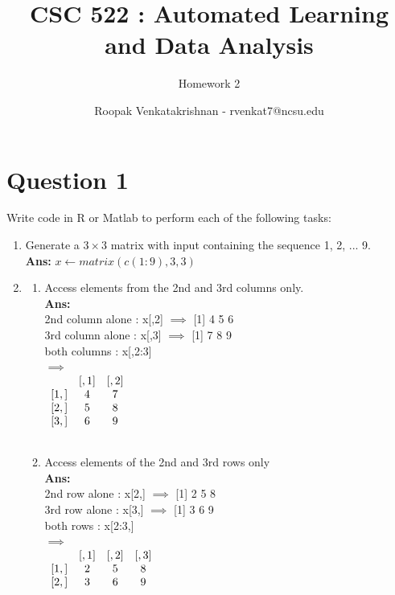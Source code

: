 \documentclass[fontsize=10pt]{scrartcl}
\begin{document}
	\title{CSC 522 : Automated Learning and Data Analysis}
	\subtitle{Homework 2}
	\author{Roopak Venkatakrishnan - rvenkat7@ncsu.edu}
	\maketitle

	\section{Question 1}
		Write code in R or Matlab to perform each of the following tasks:
		\begin{enumerate}
			\item
			Generate a $3 \times 3$ matrix with input containing the sequence 1, 2, ... 9. \\
			\textbf{Ans:} $x \leftarrow matrix(c(1:9),3,3)$
			\item
			\begin{enumerate}
				\item
				Access elements from the 2nd and 3rd columns only. \\
				\textbf{Ans:} \\
				2nd column alone : x[,2] $\implies$ [1] 4 5 6\\
				3rd column alone : x[,3] $\implies$ [1] 7 8 9\\ 
				both columns     : x[,2:3] \\
				$\implies$ \\
				
				$\begin{array}{ccc} 
					~		&	[,1]	&	[,2]	\\ \relax
					[1,]	&	4	 	&	7		\\ \relax
					[2,]	&	5		&	8		\\ \relax
					[3,]	&	6		&	9		\\ \relax
				\end{array}$

				
				\item
				Access elements of the 2nd and 3rd rows only \\
				\textbf{Ans:} \\
				2nd row alone : x[2,] $\implies$ [1] 2 5 8\\
				3rd row alone : x[3,] $\implies$ [1] 3 6 9\\ 
				both rows     : x[2:3,] \\
				$\implies$ \\
				$\begin{array}{cccc}
					~		&	[,1]	&	[,2]	&	[,3]	\\ \relax
					[1,]	&	2		&	5		&	8		\\ \relax
					[2,]	&	3		&	6		&	9		\\ \relax
				\end{array}$



\end{enumerate}
\end{enumerate}
\end{document}
